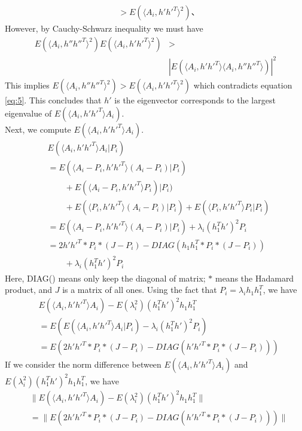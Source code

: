 \documentclass[10pt,journal,compsoc]{IEEEtran}
\newenvironment{proof}[1][Proof]{\begin{trivlist}
		\item[\hskip \labelsep {\bfseries #1}]}{\end{trivlist}}
\begin{document}
\begin{proof} [Proof of Theorem 4.2]
\begin{align*}
	&> E(\langle A_{i},h' h'^T \rangle ^2)  、
	\end{align*}
	However, by Cauchy-Schwarz inequality we must have
	\begin{align*} E(\langle A_{i},h'' h''^T \rangle^2)  E(\langle A_{i},h' h'^T \rangle^2) &> \\
	&|E(\langle A_{i},h' h'^T \rangle \langle A_{i},h'' h''^T \rangle)|^2 
	\end{align*}
	This implies $E(\langle A_{i},h'' h''^T \rangle^2) > E(\langle A_{i},h' h'^T \rangle^2)$ which contradicts equation \eqref{eq:5}. This concludes that $h'$ is the eigenvector corresponds to the largest eigenvalue of $E(\langle A_{i},h' h'^T \rangle A_{i})$. \\
	
	\noindent Next, we compute $E(\langle A_{i},h' h'^T \rangle A_{i})$.
	\begin{align*}
	&E(\langle A_{i},h' h'^T \rangle A_{i}|P_i)    \\
	&=E( \langle A_{i}-P_i,h' h'^T \rangle (A_{i}-P_i)|P_i)\\
	&\qquad {}+E(\langle A_{i}-P_i,h' h'^T \rangle P_i)|P_i) \\
	&\qquad {} +E(\langle P_i,h' h'^T \rangle (A_{i}-P_i)|P_i)+E(\langle P_i,h' h'^T \rangle P_i|P_i) \\
	&= E(\langle A_{i}-P_i,h' h'^T \rangle (A_{i}-P_i)|P_i) + \lambda_i (h_1^Th')^2 P_i \\
	&=  2h' h'^T *P_i*(J-P_i) - DIAG(h_1 h_1^T *P_i*(J-P_i)) 	\\
	&\qquad {}+\lambda_i (h_1^Th')^2 P_i 
	\end{align*}
	Here, DIAG() means only keep the diagonal of matrix; $*$ means the Hadamard product, and $J$ is a matrix of all ones. Using the fact that $P_i=\lambda_i h_1 h_1 ^T$, we have 
	\begin{align*}
	&E(\langle A_{i},h' h'^T \rangle A_{i}) - E(\lambda_i^2) (h_1^Th')^2 h_1 h_1^T \\
	&=E(E(\langle A_{i},h' h'^T \rangle A_{i}|P_i)-\lambda_i (h_1^Th')^2 P_i) 
	 \\
	&= E(2 h' h'^T *P_i*(J-P_i) - DIAG(h' h'^T*P_i*(J-P_i)))
	\end{align*}
	If we consider the norm difference between $E( \langle A_{i},h' h'^T \rangle A_{i})$ and $ E(\lambda_i^2) (h_1^Th')^2 h_1 h_1^T$, we have
	\begin{align*}
	&\|E(\langle A_{i},h' h'^T \rangle A_{i} ) - E(\lambda_i^2) (h_1^Th')^2 h_1 h_1^T\| \\
	&= \|E(2 h' h'^T *P_i*(J-P_i) - DIAG(h' h'^T*P_i*(J-P_i)))\| \\

\end{align*}
\end{proof}
\end{document}
